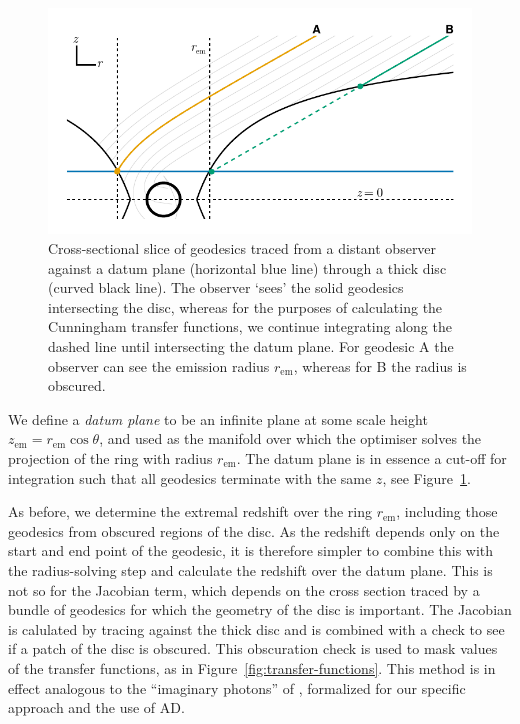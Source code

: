 \documentclass[fleqn,usenatbib]{mnras}
\newcommand{\rhoem}{r_\text{em}}
\begin{document}
\begin{figure}
    \centering
    \includegraphics[width=0.95\columnwidth]{figures/datum-plane.pdf}
    \caption{Cross-sectional slice of geodesics traced from a distant observer
        against a datum plane (horizontal blue line) through a thick disc
        (curved black line). The observer `sees' the solid geodesics
        intersecting the disc, whereas for the purposes of calculating the
        Cunningham transfer functions, we continue integrating along the dashed
        line until intersecting the datum plane. For geodesic A the observer
        can see the emission radius $\rhoem$, whereas for B the radius is
        obscured.
}
    \label{fig:datum-plane-tracing}
\end{figure}

We define a \emph{datum plane} to be an infinite plane at some scale height
$z_\text{em} = \rhoem \cos \theta$, and used as the manifold over which the
optimiser solves the projection of the ring with radius $\rhoem$. The datum
plane is in essence a cut-off for integration such that all geodesics terminate
with the same $z$, see Figure~\ref{fig:datum-plane-tracing}.

As before, we determine the extremal redshift over the ring $\rhoem$, including
those geodesics from obscured regions of the disc. As the redshift depends only
on the start and end point of the geodesic, it is therefore simpler to combine
this with the radius-solving step and calculate the redshift over the datum
plane. This is not so for the Jacobian term, which depends on the cross section
traced by a bundle of geodesics for which the geometry of the disc is important.
The Jacobian is calulated by tracing against the thick disc and is combined with
a check to see if a patch of the disc is obscured. This obscuration check is
used to mask values of the transfer functions, as in
Figure~\ref{fig:transfer-functions}. This method is in effect analogous to the
``imaginary photons'' of \cite{abdikamalov_testing_2020}, formalized for our
specific approach and the use of AD.
\end{document}

